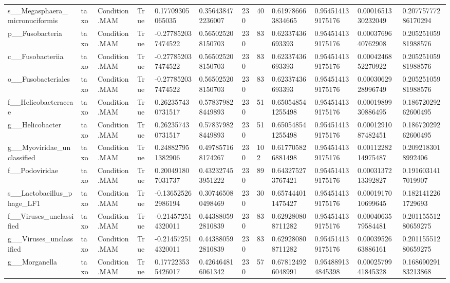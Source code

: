 \begin{longtable}{llllllllllll}
s\_\_Megasphaera\_micronuciformis & taxo & Condition.MAM & True & 0.17709305065035 & 0.356438472236007 & 230 & 40 & 0.619786663834665 & 0.954514139175176 & 0.0001651330232049 & 0.20775777286170294 \\
p\_\_Fusobacteria & taxo & Condition.MAM & True & -0.277852037474522 & 0.565025208150703 & 230 & 83 & 0.62337436693393 & 0.954514139175176 & 0.0003769640762908 & 0.20525105981988576 \\
c\_\_Fusobacteriia & taxo & Condition.MAM & True & -0.277852037474522 & 0.565025208150703 & 230 & 83 & 0.62337436693393 & 0.954514139175176 & 0.0004246852270922 & 0.20525105981988576 \\
o\_\_Fusobacteriales & taxo & Condition.MAM & True & -0.277852037474522 & 0.565025208150703 & 230 & 83 & 0.62337436693393 & 0.954514139175176 & 0.0003062928996749 & 0.20525105981988576 \\
f\_\_Helicobacteraceae & taxo & Condition.MAM & True & 0.262357430731517 & 0.578379828449893 & 230 & 51 & 0.650548541255498 & 0.954514139175176 & 0.0001989930886495 & 0.18672029262600495 \\
g\_\_Helicobacter & taxo & Condition.MAM & True & 0.262357430731517 & 0.578379828449893 & 230 & 51 & 0.650548541255498 & 0.954514139175176 & 0.0001291087482451 & 0.18672029262600495 \\
g\_\_Myoviridae\_unclassified & taxo & Condition.MAM & True & 0.248827951382906 & 0.497857168174267 & 230 & 102 & 0.617705826881498 & 0.954514139175176 & 0.0011228214975487 & 0.2092183018992406 \\
f\_\_Podoviridae & taxo & Condition.MAM & True & 0.200491807031737 & 0.432327453951222 & 230 & 89 & 0.643275273767421 & 0.954514139175176 & 0.0003137213392827 & 0.1916031417019907 \\
s\_\_Lactobacillus\_phage\_LF1 & taxo & Condition.MAM & True & -0.136525262986194 & 0.307465080498469 & 230 & 30 & 0.657444011475427 & 0.954514139175176 & 0.0001917010699645 & 0.1821412261729693 \\
f\_\_Viruses\_unclassified & taxo & Condition.MAM & True & -0.214572514320011 & 0.443880592810839 & 230 & 83 & 0.629280808711282 & 0.954514139175176 & 0.0004063579584481 & 0.20115551280659275 \\
g\_\_Viruses\_unclassified & taxo & Condition.MAM & True & -0.214572514320011 & 0.443880592810839 & 230 & 83 & 0.629280808711282 & 0.954514139175176 & 0.0003952663886161 & 0.20115551280659275 \\
g\_\_Morganella & taxo & Condition.MAM & True & 0.177223535426017 & 0.426464816061342 & 230 & 57 & 0.678124926048991 & 0.954889134845398 & 0.0002579941845328 & 0.16869029183213868 \\

\end{longtable}

